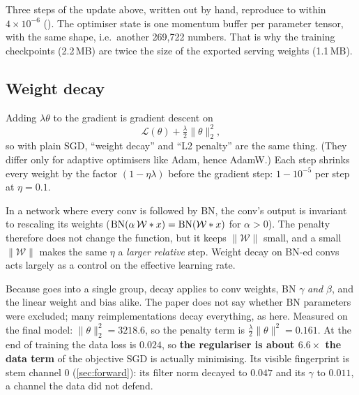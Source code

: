 \begin{repo}
Three steps of the update above, written out by hand, reproduce  to within $4\times10^{-6}$ (). The optimiser state is one momentum buffer per parameter tensor, with the same shape, i.e.\ another 269{,}722 numbers. That is why the training checkpoints (2.2\,MB) are twice the size of the exported serving weights (1.1\,MB).
\end{repo}

\subsection{Weight decay}
\label{sec:wd}

\begin{idea}
Adding $\lambda\theta$ to the gradient is gradient descent on
\[
  \mathcal L(\theta) + \tfrac{\lambda}{2}\|\theta\|_2^2 ,
\]
so with plain SGD, ``weight decay'' and ``L2 penalty'' are the same thing. (They differ only for adaptive optimisers like Adam, hence AdamW.) Each step shrinks every weight by the factor $(1-\eta\lambda)$ before the gradient step: $1-10^{-5}$ per step at $\eta=0.1$.

In a network where every conv is followed by BN, the conv's output is invariant to rescaling its weights ($\operatorname{BN}(\alpha\,\mathcal W*x)=\operatorname{BN}(\mathcal W*x)$ for $\alpha>0$). The penalty therefore does not change the function, but it keeps $\|\mathcal W\|$ small, and a small $\|\mathcal W\|$ makes the same $\eta$ a \emph{larger relative} step. Weight decay on BN-ed convs acts largely as a control on the effective learning rate.
\end{idea}

\begin{repo}
Because  goes into a single group, decay applies to conv weights, BN $\gamma$ \emph{and} $\beta$, and the linear weight and bias alike. The paper does not say whether BN parameters were excluded; many reimplementations decay everything, as here. Measured on the final model: $\|\theta\|_2^2 = 3218.6$, so the penalty term is $\tfrac{\lambda}{2}\|\theta\|^2 = 0.161$. At the end of training the data loss is $0.024$, so \textbf{the regulariser is about $6.6\times$ the data term} of the objective SGD is actually minimising. Its visible fingerprint is stem channel 0 (\cref{sec:forward}): its filter norm decayed to $0.047$ and its $\gamma$ to $0.011$, a channel the data did not defend.
\end{repo}

